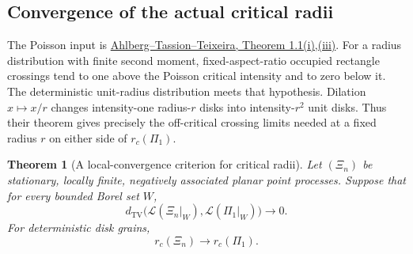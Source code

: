 \documentclass[11pt,a4paper]{article}
\newtheorem{theorem}{Theorem}
\theoremstyle{definition}
\theoremstyle{remark}
\numberwithin{equation}{section}
\begin{document}
\subsection{Convergence of the actual critical radii}

The Poisson input is
\href{https://arxiv.org/html/1605.05926v1}{Ahlberg--Tassion--Teixeira,
Theorem 1.1(i),(iii)}.  For a radius distribution with finite
second moment, fixed-aspect-ratio occupied rectangle crossings
tend to one above the Poisson critical intensity and to zero
below it.  The deterministic unit-radius distribution meets that
hypothesis.  Dilation $x\mapsto x/r$ changes intensity-one
radius-$r$ disks into intensity-$r^2$ unit disks.  Thus their
theorem gives precisely the off-critical crossing limits needed
at a fixed radius $r$ on either side of $r_c(\Pi_1)$.

\begin{theorem}[A local-convergence criterion for critical radii]
\label{ell:general-limit}
Let $(\Xi_n)$ be stationary, locally finite, negatively associated
planar point processes.  Suppose that for every bounded Borel set
$W$,
\[
 d_{\mathrm{TV}}\bigl(\mathcal L(\Xi_n|_W),
                     \mathcal L(\Pi_1|_W)\bigr)\longrightarrow0.
\]
For deterministic disk grains,
\begin{equation}\label{ell:general-rc-limit}
 r_c(\Xi_n)\longrightarrow r_c(\Pi_1).
\end{equation}
\end{theorem}
\end{document}
